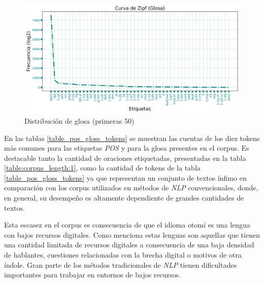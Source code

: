 \documentclass[letterpaper,12pt,oneside]{book}
\theoremstyle{definition}
\begin{document}
\begin{figure}
	\centering
	\includegraphics[width=\textwidth]{zipf_gloss}
	\caption{Distribución de glosa (primeras 50)}
	\label{fig:gloss_distrib}
\end{figure}

En las tablas \ref{table_pos_gloss_tokens} se muestran las cuentas de los diez tokens más comunes para las etiquetas \textit{POS} y para la glosa presentes en el corpus. Es destacable tanto la cantidad de oraciones etiquetadas, presentadas en la tabla \ref{table:corpus_length:1}, como la cantidad de tokens de la tabla \ref{table_pos_gloss_tokens} ya que representan un conjunto de textos ínfimo en comparación con los corpus utilizados en métodos de \textit{NLP} convencionales, donde, en general, su desempeño es altamente dependiente de grandes cantidades de textos.

Esta escasez en el corpus es consecuencia de que el idioma otomí es una lengua con bajos recursos digitales. Como menciona \citet{vasquesextraccion} estas lenguas son aquellas que tienen una cantidad limitada de recursos digitales a consecuencia de una baja densidad de hablantes, cuestiones relacionadas con la brecha digital o motivos de otra índole. Gran parte de los métodos tradicionales de \textit{NLP} tienen dificultades importantes para trabajar en entornos de bajos recursos.
\end{document}
